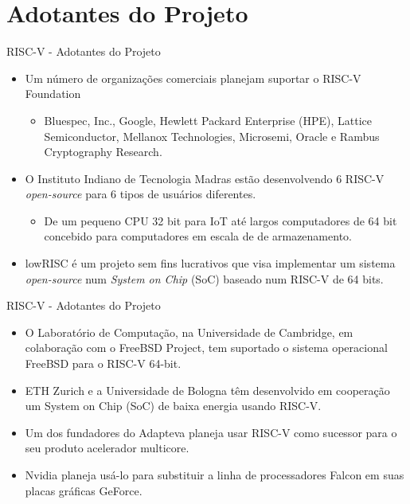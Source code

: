 \documentclass[aspectratio=169]{beamer}
\begin{document}
\section{Adotantes do Projeto}
\begin{frame}{RISC-V - Adotantes do Projeto}
	\begin{itemize}
		\item Um número de organizações comerciais planejam suportar o RISC-V Foundation
		\begin{itemize}
			\item Bluespec, Inc., Google, Hewlett Packard Enterprise (HPE), Lattice Semiconductor, Mellanox Technologies, Microsemi, Oracle e Rambus Cryptography Research.
		\end{itemize}

		\item O Instituto Indiano de Tecnologia Madras estão desenvolvendo 6 RISC-V \textit{open-source} para 6 tipos de usuários diferentes.
		\begin{itemize}
			\item De um pequeno CPU 32 bit para IoT até largos computadores de 64 bit concebido para computadores em escala de de armazenamento.
		\end{itemize}

		\item lowRISC é um projeto sem fins lucrativos que visa implementar um sistema \textit{open-source} num \textit{System on Chip} (SoC) baseado num RISC-V de 64 bits.
	\end{itemize}
\end{frame}

\begin{frame}{RISC-V - Adotantes do Projeto}
	\begin{itemize}
		\item O Laboratório de Computação, na Universidade de Cambridge, em colaboração com o FreeBSD Project, tem suportado o sistema operacional FreeBSD para o RISC-V 64-bit.

		\item ETH Zurich e a Universidade de Bologna têm desenvolvido em cooperação um System on Chip (SoC) de baixa energia usando RISC-V.

		\item Um dos fundadores do Adapteva planeja usar RISC-V como sucessor para o seu produto acelerador multicore.

		\item Nvidia planeja usá-lo para substituir a linha de processadores Falcon em suas placas gráficas GeForce.
	\end{itemize}
\end{frame}

\maketitle





\maketitle
\end{document}
